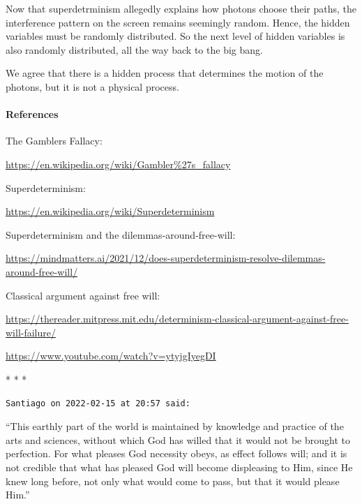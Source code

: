 Now that superdetrminism allegedly explains how photons choose their paths, the interference pattern on the screen remains seemingly random. Hence, the hidden variables must be randomly distributed. So the next level of hidden variables is also randomly distributed, all the way back to the big bang.

We agree that there is a hidden process that determines the motion of the photons, but it is not a physical process.

\paragraph{References}


The Gamblers Fallacy: 

\url{https://en.wikipedia.org/wiki/Gambler\%27s_fallacy}

Superdeterminism: 

\url{https://en.wikipedia.org/wiki/Superdeterminism}

Superdeterminism and the dilemmas-around-free-will: 

\url{https://mindmatters.ai/2021/12/does-superdeterminism-resolve-dilemmas-around-free-will/}

Classical argument against free will: 

\url{https://thereader.mitpress.mit.edu/determinism-classical-argument-against-free-will-failure/}

\url{https://www.youtube.com/watch?v=ytyjgIyegDI}


\begin{center}* * *\end{center}

\begin{footnotesize}
\begin{sffamily}
\texttt{Santiago on 2022-02-15 at 20:57 said:}

``This earthly part of the world is maintained by knowledge and practice of the arts and sciences, without which God has willed that it would not be brought to perfection. For what pleases God necessity obeys, as effect follows will; and it is not credible that what has pleased God will become displeasing to Him, since He knew long before, not only what would come to pass, but that it would please Him.''

\end{sffamily}
\end{footnotesize}
